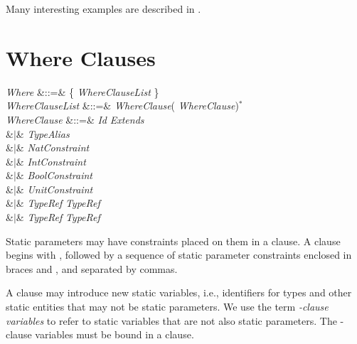 Many interesting examples are described in .



\section{Where Clauses}


\begin{Grammar}
\emph{Where} &::=&  \{ \emph{WhereClauseList} \}\\
\emph{WhereClauseList} &::=& \emph{WhereClause}(\EXP{,}
\emph{WhereClause})$^*$ \\
\emph{WhereClause} &::=& \emph{Id} \emph{Extends}\\
&$|$& \emph{TypeAlias} \\
&$|$& \emph{NatConstraint} \\
&$|$& \emph{IntConstraint} \\
&$|$& \emph{BoolConstraint} \\
&$|$& \emph{UnitConstraint} \\
&$|$& \emph{TypeRef}  \emph{TypeRef}\\
&$|$& \emph{TypeRef}  \emph{TypeRef}\\
\end{Grammar}


Static parameters may have constraints placed on them
in a  clause.
A  clause begins with
, followed by a sequence of static
parameter constraints enclosed in braces \EXP{\{} and \EXP{\}},
and separated by commas.


A  clause may introduce new static variables, i.e., identifiers
for types and other static entities that may not be static parameters.
We use the term \emph{-clause variables} to refer to
static variables that are not also static parameters.
The -clause variables must be bound in a  clause.


